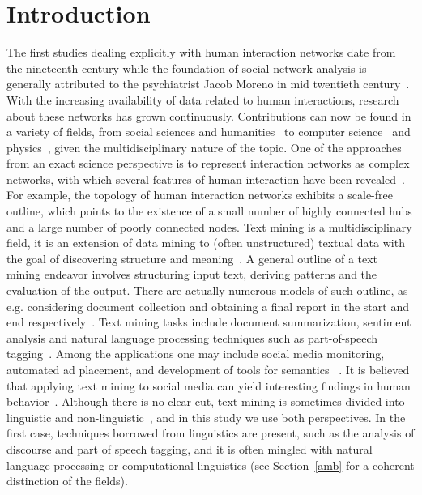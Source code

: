 \documentclass[review]{elsarticle}
\begin{document}
\linenumbers

\section{Introduction}
The first studies dealing explicitly with human interaction networks
date from the nineteenth century while the foundation of
social network analysis is generally attributed to the psychiatrist Jacob Moreno in mid twentieth century~\cite{moreno,newmanBook}.
With the increasing availability of data related to human interactions, research about these networks has grown continuously.
Contributions can now be found in a variety of fields, from social sciences and humanities~\cite{latour2013} to computer science~\cite{bird} and physics~\cite{barabasiHumanDyn,newmanFriendship}, given the multidisciplinary nature of the topic.
One of the approaches from an exact science perspective is to represent interaction networks as complex networks, with which 
several features of human interaction have been revealed~\cite{barabasiHumanDyn,newmanFriendship}.
For example, the topology of human interaction networks exhibits a scale-free outline,
which points to the existence of a small number of highly connected hubs and a large number of poorly connected nodes.
Text mining is a multidisciplinary field,
it is an extension of data mining to (often unstructured) textual data
with the goal of discovering structure and meaning~\cite{customText}.
A general outline of a text mining endeavor involves structuring input text,
deriving patterns and the evaluation of the output.
There are actually numerous models of such outline,
as e.g. considering document collection and obtaining a final report in the
start and end respectively~\cite{textSurvey}.
Text mining tasks include document summarization, sentiment analysis
and natural language processing techniques such as part-of-speech tagging~\cite{nltk}.
Among the applications one may include social media monitoring, automated ad placement, and development of tools for 
semantics ~\cite{textSurvey}.
It is believed that applying text mining to social media
can yield interesting findings in human behavior~\cite{customText}.
Although there is no clear cut, text mining is sometimes divided into linguistic and non-linguistic~\cite{customText},
and in this study we use both perspectives.
In the first case, techniques borrowed from linguistics are present, such as
the analysis of discourse and part of speech tagging,
and it is often mingled with natural language processing or computational linguistics (see Section~\ref{amb} for a coherent distinction of the fields).
\end{document}
